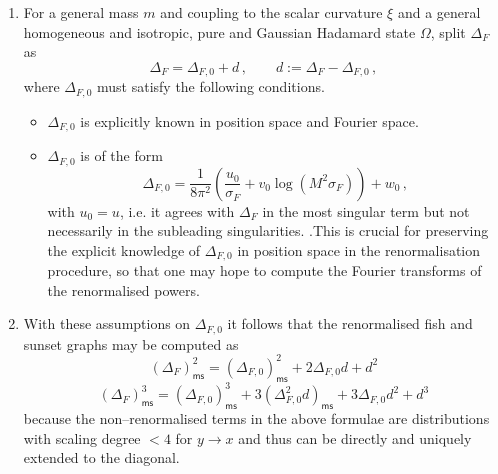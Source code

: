 \documentclass[10pt]{book}
\newcommand{\ms}{\mathsf{ms}}
\theoremstyle{break}
\begin{document}
\begin{enumerate}
\item For a general mass $m$ and coupling to the scalar curvature $\xi$ and a general homogeneous and isotropic, pure and Gaussian Hadamard state $\Omega$, split $\Delta_F$ as
\begin{equation}%
\Delta_F=\Delta_{F,0}+d\,,\qquad d:=\Delta_F-\Delta_{F,0}\,,\end{equation}
where $\Delta_{F,0}$ must satisfy the following conditions.
\begin{itemize}
\item $\Delta_{F,0}$ is explicitly known in position space and Fourier space.
\item $\Delta_{F,0}$ is of the form
$$\Delta_{F,0}=\frac{1}{8\pi^2}\left(\frac{u_0}{\sigma_F}+v_0\log \left(M^2\sigma_F\right)\right)+w_0\,,$$
with $u_0=u$, i.e. it agrees with $\Delta_F$ in the most singular term but not necessarily in the subleading singularities.
.This is crucial for preserving the explicit knowledge of $\Delta_{F,0}$ in position space in the renormalisation procedure, so that one may hope to compute the Fourier transforms of the renormalised powers.
\end{itemize}

\item With these assumptions on $\Delta_{F,0}$ it follows that the renormalised fish and sunset graphs may be computed as
\begin{equation}%
(\Delta_{F})^2_\ms = (\Delta_{F,0})^2_\ms + 2 \Delta_{F,0} d+ d^2\end{equation}
$$(\Delta_{F})^3_\ms = (\Delta_{F,0})^3_\ms + 3 \left(\Delta^2_{F,0} d\right)_\ms+ 3  \Delta_{F,0} d^2+ d^3$$
because the non--renormalised terms in the above formulae are distributions with scaling degree $<4$ for $y\to x$ and thus can be directly and uniquely extended to the diagonal.


\end{enumerate}
\end{document}
